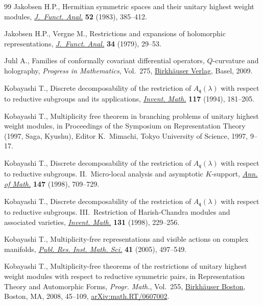 \documentclass[pdftex]{sigma}
\numberwithin{equation}{section}
\begin{document}
\begin{thebibliography}{99}
Jakobsen H.P., Hermitian symmetric spaces and their unitary highest weight
 modules, \href{https://doi.org/10.1016/0022-1236(83)90076-9}{\textit{J.~Funct. Anal.}} \textbf{52} (1983), 385--412.

Jakobsen H.P., Vergne M., Restrictions and expansions of holomorphic
 representations, \href{https://doi.org/10.1016/0022-1236(79)90023-5}{\textit{J.~Funct. Anal.}} \textbf{34} (1979), 29--53.

Juhl A., Families of conformally covariant differential operators,
 {$Q$}-curvature and holography, \textit{Progress in Mathematics}, Vol.~275,
 \href{https://doi.org/10.1007/978-3-7643-9900-9}{Birkh\"{a}user Verlag}, Basel, 2009.

Kobayashi T., Discrete decomposability of the restriction of {$A_{\mathfrak
 q}(\lambda)$} with respect to reductive subgroups and its applications,
 \href{https://doi.org/10.1007/BF01232239}{\textit{Invent. Math.}} \textbf{117} (1994), 181--205.

Kobayashi T., Multiplicity free theorem in branching problems of unitary
 highest weight modules, in Proceedings of the Symposium on Representation
 Theory (1997, Saga, Kyushu), Editor K.~Mimachi, Tokyo University of Science, 1997, 9--17.

Kobayashi T., Discrete decomposability of the restriction of {$A_{\mathfrak
 q}(\lambda)$} with respect to reductive subgroups. {II}.~{M}icro-local
 analysis and asymptotic {$K$}-support, \href{https://doi.org/10.2307/120963}{\textit{Ann. of Math.}} \textbf{147}
 (1998), 709--729.

Kobayashi T., Discrete decomposability of the restriction of {$A_{\mathfrak
 q}(\lambda)$} with respect to reductive subgroups. {III}.~{R}estriction of
 {H}arish-{C}handra modules and associated varieties, \href{https://doi.org/10.1007/s002220050203}{\textit{Invent. Math.}}
 \textbf{131} (1998), 229--256.

Kobayashi T., Multiplicity-free representations and visible actions on complex
 manifolds, \href{https://doi.org/10.2977/prims/1145475221}{\textit{Publ. Res. Inst. Math. Sci.}} \textbf{41} (2005), 497--549.

Kobayashi T., Multiplicity-free theorems of the restrictions of unitary highest
 weight modules with respect to reductive symmetric pairs, in Representation
 Theory and Automorphic Forms, \textit{Progr. Math.}, Vol.~255, \href{https://doi.org/10.1007/978-0-8176-4646-2_3}{Birkh\"{a}user
 Boston}, Boston, MA, 2008, 45--109, \href{https://arxiv.org/abs/math.RT/0607002}{arXiv:math.RT/0607002}.


\end{thebibliography}
\end{document}
